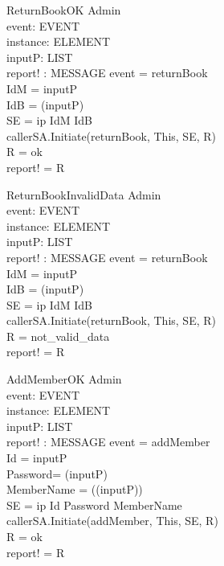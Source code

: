 \begin{schema} {ReturnBookOK}
\Xi Admin \\
event: EVENT \\
instance: ELEMENT \\
inputP: LIST \\
report! : MESSAGE 
\where event = returnBook \\
IdM = \head inputP \\ 
IdB = \head (\tail inputP) \\ 
SE = \lseq ip IdM IdB \rseq \\
callerSA.Initiate(returnBook, This, SE, R) \\
R = ok \\
report! = R 
\end{schema}

\begin{schema}{ReturnBookInvalidData}
\Xi Admin \\
event: EVENT \\
instance: ELEMENT \\
inputP: LIST \\
report! : MESSAGE 
\where event = returnBook \\
IdM = \head inputP \\ 
IdB = \head (\tail inputP) \\ 
SE = \lseq ip IdM IdB \rseq \\
callerSA.Initiate(returnBook, This, SE, R) \\
R = not\_valid\_data \\ 
report! = R
\end{schema}


\begin{schema}{AddMemberOK}
\Xi Admin \\
event: EVENT \\
instance: ELEMENT \\
inputP: LIST \\
report! : MESSAGE 
\where event = addMember \\
Id = \head inputP \\
Password= \head (\tail inputP) \\
MemberName = \head (\tail (\tail inputP)) \\
SE = \lseq ip Id Password MemberName \rseq \\
callerSA.Initiate(addMember, This, SE, R) \\
R = ok \\
report! = R 
\end{schema}

